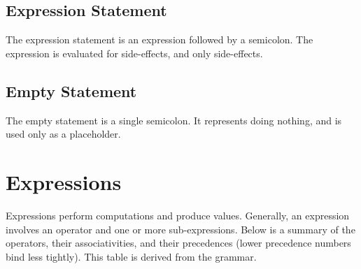 \documentclass[letterpaper,12pt]{book}
\begin{document}
\section{Expression Statement}

The expression statement is an expression followed by a semicolon. The expression is evaluated for side-effects, and only side-effects.

\section{Empty Statement}

The empty statement is a single semicolon. It represents doing nothing, and is used only as a placeholder.

\chapter{Expressions}

Expressions perform computations and produce values. Generally, an expression involves an operator and one or more sub-expressions. Below is a summary of the operators, their associativities, and their precedences (lower precedence numbers bind less tightly). This table is derived from the grammar.
\end{document}
